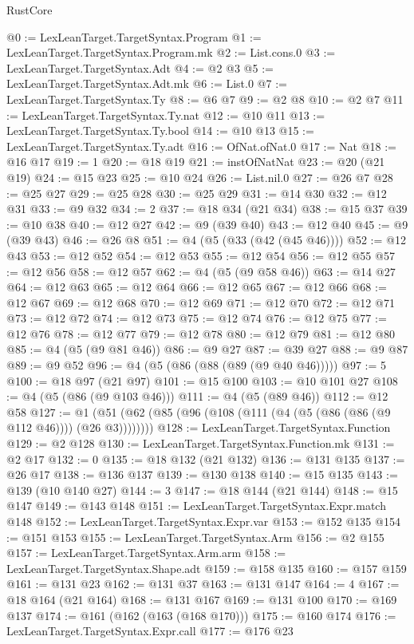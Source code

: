 \begin{lexlean}{RustCore}
\begin{coremodule}
@0 := LexLeanTarget.TargetSyntax.Program
@1 := LexLeanTarget.TargetSyntax.Program.mk
@2 := List.cons.{0}
@3 := LexLeanTarget.TargetSyntax.Adt
@4 := @2 @3
@5 := LexLeanTarget.TargetSyntax.Adt.mk
@6 := List.{0}
@7 := LexLeanTarget.TargetSyntax.Ty
@8 := @6 @7
@9 := @2 @8
@10 := @2 @7
@11 := LexLeanTarget.TargetSyntax.Ty.nat
@12 := @10 @11
@13 := LexLeanTarget.TargetSyntax.Ty.bool
@14 := @10 @13
@15 := LexLeanTarget.TargetSyntax.Ty.adt
@16 := OfNat.ofNat.{0}
@17 := Nat
@18 := @16 @17
@19 := 1
@20 := @18 @19
@21 := instOfNatNat
@23 := @20 (@21 @19)
@24 := @15 @23
@25 := @10 @24
@26 := List.nil.{0}
@27 := @26 @7
@28 := @25 @27
@29 := @25 @28
@30 := @25 @29
@31 := @14 @30
@32 := @12 @31
@33 := @9 @32
@34 := 2
@37 := @18 @34 (@21 @34)
@38 := @15 @37
@39 := @10 @38
@40 := @12 @27
@42 := @9 (@39 @40)
@43 := @12 @40
@45 := @9 (@39 @43)
@46 := @26 @8
@51 := @4 (@5 (@33 (@42 (@45 @46))))
@52 := @12 @43
@53 := @12 @52
@54 := @12 @53
@55 := @12 @54
@56 := @12 @55
@57 := @12 @56
@58 := @12 @57
@62 := @4 (@5 (@9 @58 @46))
@63 := @14 @27
@64 := @12 @63
@65 := @12 @64
@66 := @12 @65
@67 := @12 @66
@68 := @12 @67
@69 := @12 @68
@70 := @12 @69
@71 := @12 @70
@72 := @12 @71
@73 := @12 @72
@74 := @12 @73
@75 := @12 @74
@76 := @12 @75
@77 := @12 @76
@78 := @12 @77
@79 := @12 @78
@80 := @12 @79
@81 := @12 @80
@85 := @4 (@5 (@9 @81 @46))
@86 := @9 @27
@87 := @39 @27
@88 := @9 @87
@89 := @9 @52
@96 := @4 (@5 (@86 (@88 (@89 (@9 @40 @46)))))
@97 := 5
@100 := @18 @97 (@21 @97)
@101 := @15 @100
@103 := @10 @101 @27
@108 := @4 (@5 (@86 (@9 @103 @46)))
@111 := @4 (@5 (@89 @46))
@112 := @12 @58
@127 := @1 (@51 (@62 (@85 (@96 (@108 (@111 (@4 (@5 (@86 (@86 (@9 @112 @46)))) (@26 @3))))))))
@128 := LexLeanTarget.TargetSyntax.Function
@129 := @2 @128
@130 := LexLeanTarget.TargetSyntax.Function.mk
@131 := @2 @17
@132 := 0
@135 := @18 @132 (@21 @132)
@136 := @131 @135
@137 := @26 @17
@138 := @136 @137
@139 := @130 @138
@140 := @15 @135
@143 := @139 (@10 @140 @27)
@144 := 3
@147 := @18 @144 (@21 @144)
@148 := @15 @147
@149 := @143 @148
@151 := LexLeanTarget.TargetSyntax.Expr.match @148
@152 := LexLeanTarget.TargetSyntax.Expr.var
@153 := @152 @135
@154 := @151 @153
@155 := LexLeanTarget.TargetSyntax.Arm
@156 := @2 @155
@157 := LexLeanTarget.TargetSyntax.Arm.arm
@158 := LexLeanTarget.TargetSyntax.Shape.adt
@159 := @158 @135
@160 := @157 @159
@161 := @131 @23
@162 := @131 @37
@163 := @131 @147
@164 := 4
@167 := @18 @164 (@21 @164)
@168 := @131 @167
@169 := @131 @100
@170 := @169 @137
@174 := @161 (@162 (@163 (@168 @170)))
@175 := @160 @174
@176 := LexLeanTarget.TargetSyntax.Expr.call
@177 := @176 @23

\end{coremodule}
\end{lexlean}
